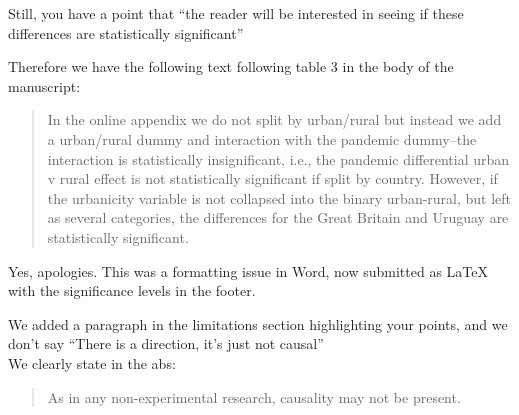 Still, you have a point that ``the reader will be interested
in seeing if these differences are statistically significant''

Therefore we have the following text following table 3 in the body of the manuscript:

\begin{quote}
  In the online appendix we do not split by urban/rural but instead we add a urban/rural dummy and interaction with the
pandemic dummy--the interaction is statistically insignificant, i.e., the pandemic differential urban v rural effect is not
statistically significant if split by country. However, if the urbanicity variable is not collapsed into the binary urban-rural,
but left as several categories, the differences for the Great Britain and Uruguay are statistically significant.
\end{quote}


Yes, apologies. This was a formatting issue in Word, now submitted as LaTeX with the significance levels in the footer.


We added a paragraph in the limitations section highlighting your points, and we don't say ``There is a direction, it's just not causal''\\

We clearly state in the abs:
\begin{quote}
  As in any
 non-experimental research, causality may not be present.
\end{quote}

